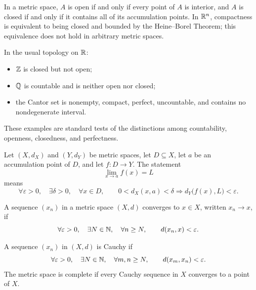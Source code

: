 \begin{definition}
        In a metric space, $A$ is open if and only if every point of $A$ is
        interior, and $A$ is closed if and only if it contains all of its
        accumulation points. In $\mathbb{R}^n$,
        compactness is equivalent to being closed and bounded by the
        Heine--Borel Theorem; this equivalence does not hold in arbitrary metric
        spaces.
    \end{definition}

    \begin{fact}
        In the usual topology on $\mathbb{R}$:
        \begin{itemize}
            \item $\mathbb{Z}$ is closed but not open;
            \item $\mathbb{Q}$ is countable and is neither open nor closed;
            \item the Cantor set is nonempty, compact, perfect, uncountable, and
                  contains no nondegenerate interval.
        \end{itemize}
        These examples are standard tests of the distinctions among countability,
        openness, closedness, and perfectness.
    \end{fact}

    \begin{definition}
        Let $(X,d_X)$ and $(Y,d_Y)$ be metric spaces, let $D\subseteq X$, let
        $a$ be an accumulation point of $D$, and let $f\colon D\to Y$. The statement
        \[
            \lim\limits_{x\to a}f(x)=L
        \]
        means
        \[
            \forall\varepsilon>0,
            \quad
            \exists\delta>0,
            \quad
            \forall x\in D,
            \qquad
            0<d_X(x,a)<\delta
            \Rightarrow
            d_Y\bigl(f(x),L\bigr)<\varepsilon.
        \]
    \end{definition}

    \begin{definition}
        A sequence $(x_n)$ in a metric space $(X,d)$ converges to $x\in X$,
        written $x_n\to x$, if
        \[
            \forall\varepsilon>0,
            \quad
            \exists N\in\mathbb{N},
            \quad
            \forall n\geq N,
            \qquad
            d(x_n,x)<\varepsilon.
        \]
    \end{definition}

    \begin{definition}
        A sequence $(x_n)$ in $(X,d)$ is Cauchy if
        \[
            \forall\varepsilon>0,
            \quad
            \exists N\in\mathbb{N},
            \quad
            \forall m,n\geq N,
            \qquad
            d(x_m,x_n)<\varepsilon.
        \]
        The metric space is complete if every Cauchy sequence in $X$ converges
        to a point of $X$.
    \end{definition}

